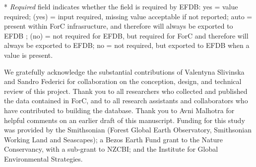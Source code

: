 \documentclass[, manuscript]{copernicus}
\begin{document}
* \emph{Required} field indicates whether the field is required by EFDB:
yes = value required; (yes) = input required, missing value acceptable
if not reported; auto = present within ForC infrasructure, and therefore
will always be exported to EFDB ; (no) = not required for EFDB, but
required for ForC and therefore will always be exported to EFDB; no =
not required, but exported to EFDB when a value is present.











\begin{acknowledgements}
We gratefully acknowledge the substantial contributions of Valentyna
Slivinska and Sandro Federici for collaboration on the conception,
design, and technical review of this project. Thank you to all
researchers who collected and published the data contained in ForC, and
to all research assistants and collaborators who have contributed to
building the database. Thank you to Avni Malhotra for helpful comments
on an earlier draft of this manuscript. Funding for this study was
provided by the Smithsonian (Forest Global Earth Observatory,
Smithsonian Working Land and Seascapes); a Bezos Earth Fund grant to the
Nature Conservancy, with a sub-grant to NZCBI; and the Institute for
Global Environmental Strategies.
\end{acknowledgements}
\end{document}
